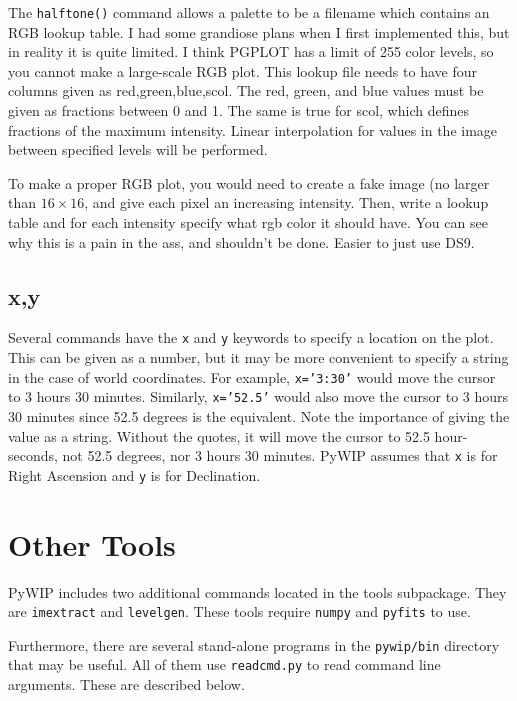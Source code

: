 \documentclass[12pt]{article}
\newcommand{\pywip}{PyWIP}
\begin{document}
The \texttt{halftone()} command allows a palette to be a filename which contains
an RGB lookup table.  I had some grandiose plans when I first implemented this,
but in reality it is quite limited.  I think PGPLOT has a limit of 255 color
levels, so you cannot make a large-scale RGB plot.  This lookup file needs to
have four columns given as red,green,blue,scol.  The red, green, and blue 
values must be given as fractions between 0 and 1.  The same is true for scol,
which defines fractions of the maximum intensity.  Linear interpolation for
values in the image between specified levels will be performed.

To make a proper RGB plot, you would need to create a fake image (no larger
than $16\times16$, and give each pixel an increasing intensity.  Then, write
a lookup table and for each intensity specify what rgb color it should have.
You can see why this is a pain in the ass, and shouldn't be done.  Easier to
just use DS9.

\subsection{x,y}

Several commands have the \texttt{x} and \texttt{y} keywords to specify a
location on the plot.  This can be given as a number, but it may be more
convenient to specify a string in the case of world coordinates.  For example,
\texttt{x='3:30'} would move the cursor to 3 hours 30 minutes.  Similarly,
\texttt{x='52.5'} would also move the cursor to 3 hours 30 minutes since 52.5
degrees is the equivalent.  Note the importance of giving the value as a string.
Without the quotes, it will move the cursor to 52.5 hour-seconds, not 52.5
degrees, nor 3 hours 30 minutes.  \pywip{} assumes that \texttt{x} is for Right
Ascension and \texttt{y} is for Declination.

\section{Other Tools}

\pywip{} includes two additional commands located in the tools subpackage.
They are \texttt{imextract} and \texttt{levelgen}.  These tools require
\texttt{numpy} and \texttt{pyfits} to use.

Furthermore, there are several stand-alone programs in the \texttt{pywip/bin}
directory that may be useful.  All of them use \texttt{readcmd.py} to read
command line arguments.  These are described below.
\end{document}
